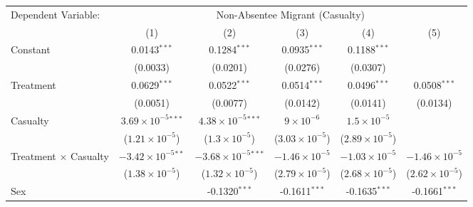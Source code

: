 \begingroup
\centering
\renewcommand{\arraystretch}{0.75}   %
\setlength{\aboverulesep}{0pt}       %
\setlength{\belowrulesep}{0pt}
\begin{tabular}{lccccc}
   \tabularnewline \midrule \midrule
   Dependent Variable: & \multicolumn{5}{c}{Non-Absentee Migrant (Casualty)}\\
                                               
                                         & (1)                           & (2)                            & (3)                     & (4)                     & (5)\\  
   \midrule
   
   Constant                                    & 0.0143$^{***}$                & 0.1284$^{***}$                 & 0.0935$^{***}$          & 0.1188$^{***}$          &   \\   
                                               & (0.0033)                      & (0.0201)                       & (0.0276)                & (0.0307)                &   \\   
   Treatment                                   & 0.0629$^{***}$                & 0.0522$^{***}$                 & 0.0514$^{***}$          & 0.0496$^{***}$          & 0.0508$^{***}$\\   
                                               & (0.0051)                      & (0.0077)                       & (0.0142)                & (0.0141)                & (0.0134)\\   
   Casualty                               & $3.69\times 10^{-5}$$^{***}$  & $4.38\times 10^{-5}$$^{***}$   & $9\times 10^{-6}$       & $1.5\times 10^{-5}$     &   \\   
                                               & ($1.21\times 10^{-5}$)        & ($1.3\times 10^{-5}$)          & ($3.03\times 10^{-5}$)  & ($2.89\times 10^{-5}$)  &   \\   
   Treatment $\times$ Casualty            & $-3.42\times 10^{-5}$$^{**}$  & $-3.68\times 10^{-5}$$^{***}$  & $-1.46\times 10^{-5}$   & $-1.03\times 10^{-5}$   & $-1.46\times 10^{-5}$\\    
                                               & ($1.38\times 10^{-5}$)        & ($1.32\times 10^{-5}$)         & ($2.79\times 10^{-5}$)  & ($2.68\times 10^{-5}$)  & ($2.62\times 10^{-5}$)\\    
   Sex                                         &                               & -0.1320$^{***}$                & -0.1611$^{***}$         & -0.1635$^{***}$         & -0.1661$^{***}$\\   

\end{tabular}
